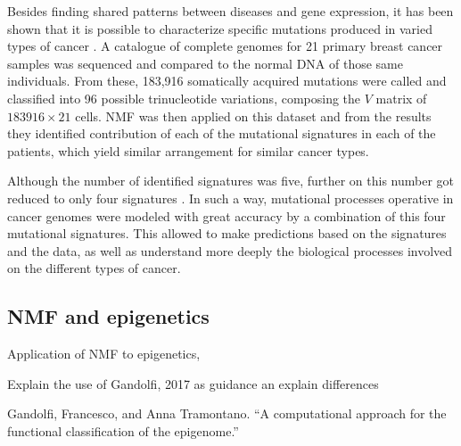Besides finding shared patterns between diseases and gene expression, it has been shown that it is possible to characterize specific mutations produced in varied types of cancer \cite{Ramakrishna2012}. A catalogue of complete genomes for 21 primary breast cancer samples was sequenced and compared to the normal DNA of those same individuals. From these, 183,916 somatically acquired mutations were called and classified into 96 possible trinucleotide variations, composing the $V$ matrix of $183916 \times 21$ cells. NMF was then applied on this dataset and from the results they identified contribution of each of the mutational signatures in each of the patients, which yield similar arrangement for similar cancer types.

\medskip

Although the number of identified signatures was five, further on this number got reduced to only four signatures \cite{Alexandrov2013}. In such a way, mutational processes operative in cancer genomes were modeled with great accuracy by a combination of this four mutational signatures. This allowed to make predictions based on the signatures and the data, as well as understand more deeply the biological processes involved on the different types of cancer.

\subsection{NMF and epigenetics}

Application of NMF to epigenetics,

Explain the use of Gandolfi, 2017 as guidance an explain differences

Gandolfi, Francesco, and Anna Tramontano. ``A computational approach for the functional classification of the epigenome.''
